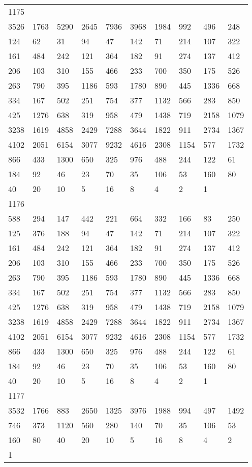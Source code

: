 \begin{longtable}{*{10}{l}}
1175&&&&&&&&&\\
3526& 1763& 5290& 2645& 7936& 3968& 1984& 992& 496& 248\\
124& 62& 31& 94& 47& 142& 71& 214& 107& 322\\
161& 484& 242& 121& 364& 182& 91& 274& 137& 412\\
206& 103& 310& 155& 466& 233& 700& 350& 175& 526\\
263& 790& 395& 1186& 593& 1780& 890& 445& 1336& 668\\
334& 167& 502& 251& 754& 377& 1132& 566& 283& 850\\
425& 1276& 638& 319& 958& 479& 1438& 719& 2158& 1079\\
3238& 1619& 4858& 2429& 7288& 3644& 1822& 911& 2734& 1367\\
4102& 2051& 6154& 3077& 9232& 4616& 2308& 1154& 577& 1732\\
866& 433& 1300& 650& 325& 976& 488& 244& 122& 61\\
184& 92& 46& 23& 70& 35& 106& 53& 160& 80\\
40& 20& 10& 5& 16& 8& 4& 2& 1& \\

1176&&&&&&&&&\\
588& 294& 147& 442& 221& 664& 332& 166& 83& 250\\
125& 376& 188& 94& 47& 142& 71& 214& 107& 322\\
161& 484& 242& 121& 364& 182& 91& 274& 137& 412\\
206& 103& 310& 155& 466& 233& 700& 350& 175& 526\\
263& 790& 395& 1186& 593& 1780& 890& 445& 1336& 668\\
334& 167& 502& 251& 754& 377& 1132& 566& 283& 850\\
425& 1276& 638& 319& 958& 479& 1438& 719& 2158& 1079\\
3238& 1619& 4858& 2429& 7288& 3644& 1822& 911& 2734& 1367\\
4102& 2051& 6154& 3077& 9232& 4616& 2308& 1154& 577& 1732\\
866& 433& 1300& 650& 325& 976& 488& 244& 122& 61\\
184& 92& 46& 23& 70& 35& 106& 53& 160& 80\\
40& 20& 10& 5& 16& 8& 4& 2& 1& \\

1177&&&&&&&&&\\
3532& 1766& 883& 2650& 1325& 3976& 1988& 994& 497& 1492\\
746& 373& 1120& 560& 280& 140& 70& 35& 106& 53\\
160& 80& 40& 20& 10& 5& 16& 8& 4& 2\\
1& \\


\end{longtable}
